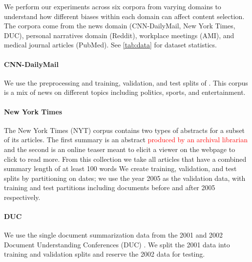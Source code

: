 We perform our experiments across six corpora from varying domains to 
understand how different biases within each domain can affect content 
selection. The corpora come from the news domain
(CNN-DailyMail, New York Times, DUC), personal narratives domain (Reddit),
workplace meetings (AMI), and medical journal articles (PubMed). See 
\autoref{tab:data} for dataset statistics.


\paragraph{CNN-DailyMail} We use the preprocessing and training, validation, 
and test splits
of \cite{see2017get}.
This corpus is a mix of news on different topics including politics,
sports, and entertainment.

\paragraph{New York Times}The New York Times (NYT) corpus \cite{sandhaus2008new} contains
 two types of abstracts for a subset of its articles. The first summary is
an abstract \textcolor{red}{produced by an archival librarian} and the 
second is an online teaser meant to elicit a viewer on the webpage to
click to read more. From this collection we take all articles that have 
a combined summary length of at least 100 words
We create training, validation, and test splits by partitioning on dates;
we use the year 2005 as the validation data, with training and test partitions
including documents before and after 2005 respectively.

\paragraph{DUC} We use the single document summarization data from the 2001
and 2002
Document Understanding Conferences (DUC) \cite{over2002introduction}. We split the 2001 data into training
and validation splits and reserve the 2002 data for testing.

